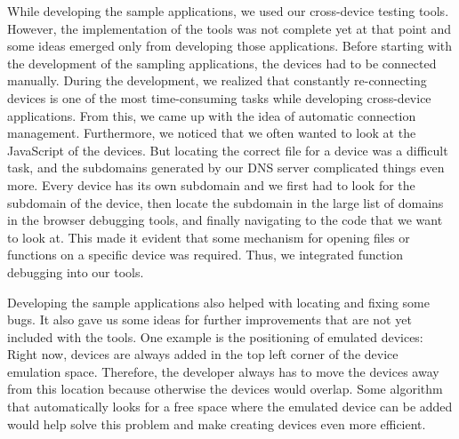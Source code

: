 While developing the sample applications, we used our cross-device testing tools. However, the implementation of the tools was not complete yet at that point and some ideas emerged only from developing those applications. Before starting with the development of the sampling applications, the devices had to be connected manually. During the development, we realized that constantly re-connecting devices is one of the most time-consuming tasks while developing cross-device applications. From this, we came up with the idea of automatic connection management. Furthermore, we noticed that we often wanted to look at the JavaScript of the devices. But locating the correct file for a device was a difficult task, and the subdomains generated by our DNS server complicated things even more. Every device has its own subdomain and we first had to look for the subdomain of the device, then locate the subdomain in the large list of domains in the browser debugging tools, and finally navigating to the code that we want to look at. This made it evident that some mechanism for opening files or functions on a specific device was required. Thus, we integrated function debugging into our tools. 

Developing the sample applications also helped with locating and fixing some bugs. It also gave us some ideas for further improvements that are not yet included with the tools. One example is the positioning of emulated devices: Right now, devices are always added in the top left corner of the device emulation space. Therefore, the developer always has to move the devices away from this location because otherwise the devices would overlap. Some algorithm that automatically looks for a free space where the emulated device can be added would help solve this problem and make creating devices even more efficient.